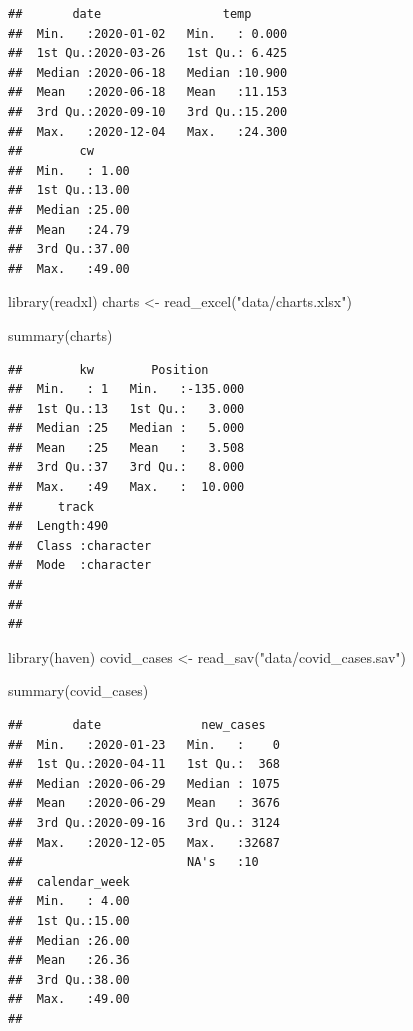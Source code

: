 \documentclass[
]{book}
\newenvironment{Shaded}{\begin{snugshade}}{\end{snugshade}}
\newcommand{\FunctionTok}[1]{\textcolor[rgb]{0.00,0.00,0.00}{#1}}
\newcommand{\NormalTok}[1]{#1}
\newcommand{\OtherTok}[1]{\textcolor[rgb]{0.56,0.35,0.01}{#1}}
\newcommand{\StringTok}[1]{\textcolor[rgb]{0.31,0.60,0.02}{#1}}
\begin{document}
\begin{verbatim}
##       date                 temp       
##  Min.   :2020-01-02   Min.   : 0.000  
##  1st Qu.:2020-03-26   1st Qu.: 6.425  
##  Median :2020-06-18   Median :10.900  
##  Mean   :2020-06-18   Mean   :11.153  
##  3rd Qu.:2020-09-10   3rd Qu.:15.200  
##  Max.   :2020-12-04   Max.   :24.300  
##        cw       
##  Min.   : 1.00  
##  1st Qu.:13.00  
##  Median :25.00  
##  Mean   :24.79  
##  3rd Qu.:37.00  
##  Max.   :49.00
\end{verbatim}

\begin{Shaded}
\begin{Highlighting}[]
\FunctionTok{library}\NormalTok{(readxl)}
\NormalTok{charts }\OtherTok{\textless{}{-}} \FunctionTok{read\_excel}\NormalTok{(}\StringTok{"data/charts.xlsx"}\NormalTok{)}

\FunctionTok{summary}\NormalTok{(charts)}
\end{Highlighting}
\end{Shaded}

\begin{verbatim}
##        kw        Position       
##  Min.   : 1   Min.   :-135.000  
##  1st Qu.:13   1st Qu.:   3.000  
##  Median :25   Median :   5.000  
##  Mean   :25   Mean   :   3.508  
##  3rd Qu.:37   3rd Qu.:   8.000  
##  Max.   :49   Max.   :  10.000  
##     track          
##  Length:490        
##  Class :character  
##  Mode  :character  
##                    
##                    
## 
\end{verbatim}

\begin{Shaded}
\begin{Highlighting}[]
\FunctionTok{library}\NormalTok{(haven)}
\NormalTok{covid\_cases }\OtherTok{\textless{}{-}} \FunctionTok{read\_sav}\NormalTok{(}\StringTok{"data/covid\_cases.sav"}\NormalTok{)}

\FunctionTok{summary}\NormalTok{(covid\_cases)}
\end{Highlighting}
\end{Shaded}

\begin{verbatim}
##       date              new_cases    
##  Min.   :2020-01-23   Min.   :    0  
##  1st Qu.:2020-04-11   1st Qu.:  368  
##  Median :2020-06-29   Median : 1075  
##  Mean   :2020-06-29   Mean   : 3676  
##  3rd Qu.:2020-09-16   3rd Qu.: 3124  
##  Max.   :2020-12-05   Max.   :32687  
##                       NA's   :10     
##  calendar_week  
##  Min.   : 4.00  
##  1st Qu.:15.00  
##  Median :26.00  
##  Mean   :26.36  
##  3rd Qu.:38.00  
##  Max.   :49.00  
## 
\end{verbatim}
\end{document}
